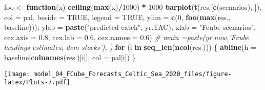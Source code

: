 \documentclass[
]{article}
\newenvironment{Shaded}{\begin{snugshade}}{\end{snugshade}}
\newcommand{\CommentTok}[1]{\textcolor[rgb]{0.56,0.35,0.01}{\textit{#1}}}
\newcommand{\ControlFlowTok}[1]{\textcolor[rgb]{0.13,0.29,0.53}{\textbf{#1}}}
\newcommand{\DataTypeTok}[1]{\textcolor[rgb]{0.13,0.29,0.53}{#1}}
\newcommand{\DecValTok}[1]{\textcolor[rgb]{0.00,0.00,0.81}{#1}}
\newcommand{\FloatTok}[1]{\textcolor[rgb]{0.00,0.00,0.81}{#1}}
\newcommand{\KeywordTok}[1]{\textcolor[rgb]{0.13,0.29,0.53}{\textbf{#1}}}
\newcommand{\NormalTok}[1]{#1}
\newcommand{\OperatorTok}[1]{\textcolor[rgb]{0.81,0.36,0.00}{\textbf{#1}}}
\newcommand{\OtherTok}[1]{\textcolor[rgb]{0.56,0.35,0.01}{#1}}
\newcommand{\StringTok}[1]{\textcolor[rgb]{0.31,0.60,0.02}{#1}}
\begin{document}
\begin{Shaded}
\begin{Highlighting}[]
\NormalTok{foo <-}\StringTok{ }\ControlFlowTok{function}\NormalTok{(x) }\KeywordTok{ceiling}\NormalTok{(}\KeywordTok{max}\NormalTok{(x)}\OperatorTok{/}\DecValTok{1000}\NormalTok{) }\OperatorTok{*}\StringTok{ }\DecValTok{1000}
\KeywordTok{barplot}\NormalTok{(}\KeywordTok{t}\NormalTok{(res.[}\KeywordTok{c}\NormalTok{(scenarios), ]), }\DataTypeTok{col =}\NormalTok{ pal, }\DataTypeTok{beside =} \OtherTok{TRUE}\NormalTok{, }\DataTypeTok{legend =} \OtherTok{TRUE}\NormalTok{, }\DataTypeTok{ylim =} \KeywordTok{c}\NormalTok{(}\DecValTok{0}\NormalTok{, }
    \KeywordTok{foo}\NormalTok{(}\KeywordTok{max}\NormalTok{(res., baseline))), }\DataTypeTok{ylab =} \KeywordTok{paste}\NormalTok{(}\StringTok{"predicted catch"}\NormalTok{, yr.TAC), }\DataTypeTok{xlab =} \StringTok{"Fcube scenarios"}\NormalTok{, }
    \DataTypeTok{cex.axis =} \FloatTok{0.8}\NormalTok{, }\DataTypeTok{cex.lab =} \FloatTok{0.6}\NormalTok{, }\DataTypeTok{cex.names =} \FloatTok{0.6}\NormalTok{)}
\CommentTok{# main =paste(yr.now,'Fcube landings estimates, dem stocks'), )}
\ControlFlowTok{for}\NormalTok{ (i }\ControlFlowTok{in} \KeywordTok{seq_len}\NormalTok{(}\KeywordTok{ncol}\NormalTok{(res.))) \{}
    \KeywordTok{abline}\NormalTok{(}\DataTypeTok{h =}\NormalTok{ baseline[}\KeywordTok{colnames}\NormalTok{(res.)[i]], }\DataTypeTok{col =}\NormalTok{ pal[i])}
\NormalTok{\}}
\end{Highlighting}
\end{Shaded}

\texttt{[image: model\_04\_FCube\_Forecasts\_Celtic\_Sea\_2020\_files/figure-latex/Plots-7.pdf]}

\begin{Shaded}
\end{Shaded}
\end{document}
